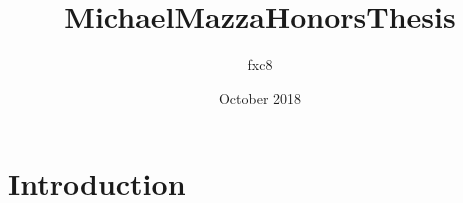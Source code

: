 \documentclass{article}
\title{MichaelMazzaHonorsThesis}
\author{fxc8 }
\date{October 2018}
\begin{document}
\maketitle

\section{Introduction}
\end{document}
